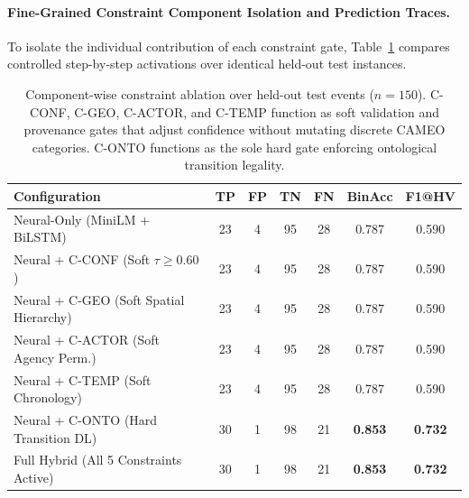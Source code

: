 \documentclass[11pt,a4paper]{article}
\begin{document}
\paragraph{Fine-Grained Constraint Component Isolation and Prediction Traces.}
To isolate the individual contribution of each constraint gate, Table~\ref{tab:gate_ablation} compares controlled step-by-step activations over identical held-out test instances.

\begin{table}[h]
\centering
\small
\caption{Component-wise constraint ablation over held-out test events ($n=150$). C-CONF, C-GEO, C-ACTOR, and C-TEMP function as soft validation and provenance gates that adjust confidence without mutating discrete CAMEO categories. C-ONTO functions as the sole hard gate enforcing ontological transition legality.}
\label{tab:gate_ablation}
\begin{tabular}{lcccccc}
\toprule
\textbf{Configuration} & \textbf{TP} & \textbf{FP} & \textbf{TN} & \textbf{FN} & \textbf{BinAcc} & \textbf{F1@HV} \\
\midrule
Neural-Only (MiniLM + BiLSTM)      & 23 & 4 & 95 & 28 & 0.787 & 0.590 \\
Neural + C-CONF (Soft $\tau \ge 0.60$) & 23 & 4 & 95 & 28 & 0.787 & 0.590 \\
Neural + C-GEO (Soft Spatial Hierarchy)& 23 & 4 & 95 & 28 & 0.787 & 0.590 \\
Neural + C-ACTOR (Soft Agency Perm.)   & 23 & 4 & 95 & 28 & 0.787 & 0.590 \\
Neural + C-TEMP (Soft Chronology)      & 23 & 4 & 95 & 28 & 0.787 & 0.590 \\
Neural + C-ONTO (Hard Transition DL)   & 30 & 1 & 98 & 21 & \textbf{0.853} & \textbf{0.732} \\
Full Hybrid (All 5 Constraints Active) & 30 & 1 & 98 & 21 & \textbf{0.853} & \textbf{0.732} \\
\bottomrule
\end{tabular}
\end{table}
\end{document}
